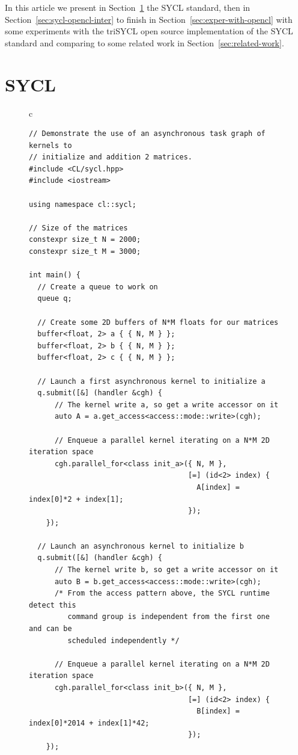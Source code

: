 \documentclass[sigplan, review]{acmart}
\begin{document}
In this article we present in Section~\ref{sec:sycl} the SYCL
standard, then in Section~\ref{sec:sycl-opencl-inter} to finish in
Section~\ref{sec:exper-with-opencl} with some experiments with the
triSYCL open source implementation of the SYCL standard and comparing
to some related work in Section~\ref{sec:related-work}.


\section{SYCL}
\label{sec:sycl}

\begin{figure}
  \begin{tabular}{c}
    \begin{lstlisting}[basicstyle=\scriptsize]
// Demonstrate the use of an asynchronous task graph of kernels to
// initialize and addition 2 matrices.
#include <CL/sycl.hpp>
#include <iostream>

using namespace cl::sycl;

// Size of the matrices
constexpr size_t N = 2000;
constexpr size_t M = 3000;

int main() {
  // Create a queue to work on
  queue q;

  // Create some 2D buffers of N*M floats for our matrices
  buffer<float, 2> a { { N, M } };
  buffer<float, 2> b { { N, M } };
  buffer<float, 2> c { { N, M } };

  // Launch a first asynchronous kernel to initialize a
  q.submit([&] (handler &cgh) {
      // The kernel write a, so get a write accessor on it
      auto A = a.get_access<access::mode::write>(cgh);

      // Enqueue a parallel kernel iterating on a N*M 2D iteration space
      cgh.parallel_for<class init_a>({ N, M },
                                     [=] (id<2> index) {
                                       A[index] = index[0]*2 + index[1];
                                     });
    });

  // Launch an asynchronous kernel to initialize b
  q.submit([&] (handler &cgh) {
      // The kernel write b, so get a write accessor on it
      auto B = b.get_access<access::mode::write>(cgh);
      /* From the access pattern above, the SYCL runtime detect this
         command group is independent from the first one and can be
         scheduled independently */

      // Enqueue a parallel kernel iterating on a N*M 2D iteration space
      cgh.parallel_for<class init_b>({ N, M },
                                     [=] (id<2> index) {
                                       B[index] = index[0]*2014 + index[1]*42;
                                     });
    });


\end{lstlisting}
\end{tabular}
\end{figure}
\end{document}

